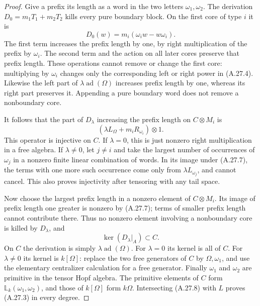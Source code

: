\begin{proof}
Give a prefix its length as a word in the two letters
$\omega_1,\omega_2$. The derivation
$D_0=m_1T_1+m_2T_2$ kills every pure boundary block.
On the first core of type $i$ it is
\[
                      D_0(w)=m_i(\omega_iw-w\omega_i).
\]
The first term increases the prefix length by one, by
right multiplication of the prefix by $\omega_i$.
The second term and the action on all later cores preserve
that prefix length. These operations cannot remove or
change the first core: multiplying by $\omega_i$ changes
only the corresponding left or right power in (A.27.4).
Likewise the left part of $\lambda\operatorname{ad}(\Omega)$
increases prefix length by one, whereas its right part
preserves it. Appending a pure boundary word does not
remove a nonboundary core.

It follows that the part of $D_\lambda$ increasing the
prefix length on $C\otimes M_i$ is
\[
           (\lambda L_\Omega+m_i R_{\omega_i})\otimes1.
                                                        \tag{A.27.7}
\]
This operator is injective on $C$. If $\lambda=0$, this
is just nonzero right multiplication in a free algebra.
If $\lambda\ne0$, let $j\ne i$ and take the largest
number of occurrences of $\omega_j$ in a nonzero finite
linear combination of words. In its image under (A.27.7),
the terms with one more such occurrence come only from
$\lambda L_{\omega_j}$, and cannot cancel. This also
proves injectivity after tensoring with any tail space.

Now choose the largest prefix length in a nonzero element
of $C\otimes M_i$. Its image of prefix length one greater
is nonzero by (A.27.7); terms of smaller prefix length
cannot contribute there. Thus no nonzero element involving
a nonboundary core is killed by $D_\lambda$, and
\[
                         \ker(D_\lambda|_A)\subset C.
                                                        \tag{A.27.8}
\]
On $C$ the derivation is simply
$\lambda\operatorname{ad}(\Omega)$. For $\lambda=0$ its
kernel is all of $C$. For $\lambda\ne0$ its kernel is
$k[\Omega]$: replace the two free generators of $C$ by
$\Omega,\omega_1$, and use the elementary centralizer
calculation for a free generator. Finally $\omega_1$ and
$\omega_2$ are primitive in the tensor Hopf algebra.
The primitive elements of $C$ form
$\mathbb L_k(\omega_1,\omega_2)$, and those of
$k[\Omega]$ form $k\Omega$. Intersecting (A.27.8) with
$L$ proves (A.27.3) in every degree.


\end{proof}
